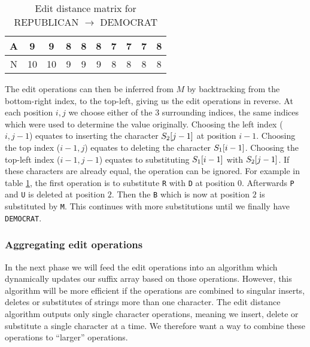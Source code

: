 \begin{table}
\begin{center}
\begin{tabular}[c]{c|c|c|c|c|c|c|c|c|c|}
			A & 9                    & 9                    & 8                    & 8                    & 8                    & 7                    & 7                    & \cellcolor{blue!25}7 & 8                    \\\hline
			N & 10                   & 10                   & 9                    & 9                    & 9                    & 8                    & 8                    & 8                    & \cellcolor{blue!25}8 \\\hline

			\hline
		\end{tabular}
	\end{center}
	\caption{Edit distance matrix for REPUBLICAN $\rightarrow$ DEMOCRAT}
	\label{tab:wagnerfischermatrix}
\end{table}


The edit operations can then be inferred from $M$ by backtracking from the bottom-right
index, to the top-left, giving us the edit operations in reverse. At each position $i, j$
we choose either of the 3 surrounding indices, the same indices which were used to
determine the value originally. Choosing the left index ($i, j - 1$) equates to inserting
the character $S_2[{j - 1}]$ at position $i - 1$. Choosing the top index ($i -
1, j$) equates to deleting the character $S_1[{i - 1}]$. Choosing the top-left
index ($i - 1, j - 1$) equates to substituting $S_1[{i - 1}]$ with
$S_2[{j - 1}]$. If these characters are already equal, the operation can be
ignored. For example in table \ref{tab:wagnerfischermatrix}, the first operation is to
substitute \verb|R| with \verb|D| at position $0$. Afterwards \verb|P| and \verb|U| is
deleted at position $2$. Then the \verb|B| which is now at position $2$ is substituted by
\verb|M|. This continues with more substitutions until we finally have \verb|DEMOCRAT|.

\subsubsection{Aggregating edit operations}

In the next phase we will feed the edit operations into an algorithm which dynamically
updates our suffix array based on those operations. However, this algorithm will be more
efficient if the operations are combined to singular inserts, deletes or substitutes of
strings more than one character. The edit distance algorithm outputs only single character
operations, meaning we insert, delete or substitute a single character at a time. We
therefore want a way to combine these operations to ``larger'' operations.

